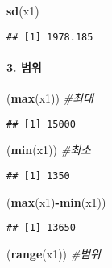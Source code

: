 \documentclass[
]{article}
\newenvironment{Shaded}{\begin{snugshade}}{\end{snugshade}}
\newcommand{\CommentTok}[1]{\textcolor[rgb]{0.56,0.35,0.01}{\textit{#1}}}
\newcommand{\FunctionTok}[1]{\textcolor[rgb]{0.13,0.29,0.53}{\textbf{#1}}}
\newcommand{\NormalTok}[1]{#1}
\newcommand{\SpecialCharTok}[1]{\textcolor[rgb]{0.81,0.36,0.00}{\textbf{#1}}}
\begin{document}
\begin{Shaded}
\begin{Highlighting}[]
\FunctionTok{sd}\NormalTok{(x1)}
\end{Highlighting}
\end{Shaded}

\begin{verbatim}
## [1] 1978.185
\end{verbatim}

\hypertarget{uxbc94uxc704}{%
\paragraph{3. 범위}\label{uxbc94uxc704}}

\begin{Shaded}
\begin{Highlighting}[]
\NormalTok{(}\FunctionTok{max}\NormalTok{(x1))           }\CommentTok{\#최대 }
\end{Highlighting}
\end{Shaded}

\begin{verbatim}
## [1] 15000
\end{verbatim}

\begin{Shaded}
\begin{Highlighting}[]
\NormalTok{(}\FunctionTok{min}\NormalTok{(x1))           }\CommentTok{\#최소}
\end{Highlighting}
\end{Shaded}

\begin{verbatim}
## [1] 1350
\end{verbatim}

\begin{Shaded}
\begin{Highlighting}[]
\NormalTok{(}\FunctionTok{max}\NormalTok{(x1)}\SpecialCharTok{{-}}\FunctionTok{min}\NormalTok{(x1))   }
\end{Highlighting}
\end{Shaded}

\begin{verbatim}
## [1] 13650
\end{verbatim}

\begin{Shaded}
\begin{Highlighting}[]
\NormalTok{(}\FunctionTok{range}\NormalTok{(x1))         }\CommentTok{\#범위 }
\end{Highlighting}
\end{Shaded}
\end{document}
